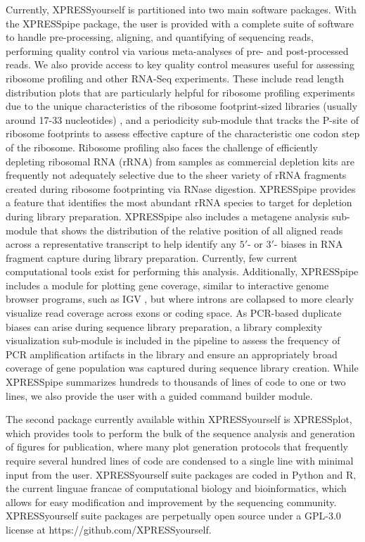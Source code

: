 \documentclass[10pt, oneside]{article}
\begin{document}
Currently, XPRESSyourself is partitioned into two main software packages. With the XPRESSpipe package, the user is provided with a complete suite of software to handle pre-processing, aligning, and quantifying of sequencing reads, performing quality control via various meta-analyses of pre- and post-processed reads. We also provide access to key quality control measures useful for assessing ribosome profiling and other RNA-Seq experiments. These include read length distribution plots that are particularly helpful for ribosome profiling experiments due to the unique characteristics of the ribosome footprint-sized libraries (usually around 17-33 nucleotides) \cite{fp_range}, and a periodicity sub-module that tracks the P-site of ribosome footprints to assess effective capture of the characteristic one codon step of the ribosome. Ribosome profiling also faces the challenge of efficiently depleting ribosomal RNA (rRNA) from samples as commercial depletion kits are frequently not adequately selective due to the sheer variety of rRNA fragments created during ribosome footprinting via RNase digestion. XPRESSpipe provides a feature that identifies the most abundant rRNA species to target for depletion during library preparation. XPRESSpipe also includes a metagene analysis sub-module that shows the distribution of the relative position of all aligned reads across a representative transcript to help identify any $5'$- or $3'$- biases in RNA fragment capture during library preparation. Currently, few current computational tools exist for performing this analysis. Additionally, XPRESSpipe includes a module for plotting gene coverage, similar to interactive genome browser programs, such as IGV \cite{igv}, but where introns are collapsed to more clearly visualize read coverage across exons or coding space. As PCR-based duplicate biases can arise during sequence library preparation, a library complexity visualization sub-module is included in the pipeline to assess the frequency of PCR amplification artifacts in the library and ensure an appropriately broad coverage of gene population was captured during sequence library creation. While XPRESSpipe summarizes hundreds to thousands of lines of code to one or two lines, we also provide the user with a guided command builder module. \par

The second package currently available within XPRESSyourself is XPRESSplot, which provides tools to perform the bulk of the sequence analysis and generation of figures for publication, where many plot generation protocols that frequently require several hundred lines of code are condensed to a single line with minimal input from the user. XPRESSyourself suite packages are coded in Python and R, the current linguae francae of computational biology and bioinformatics, which allows for easy modification and improvement by the sequencing community. XPRESSyourself suite packages are perpetually open source under a GPL-3.0 license at https://github.com/XPRESSyourself. \par
\end{document}
